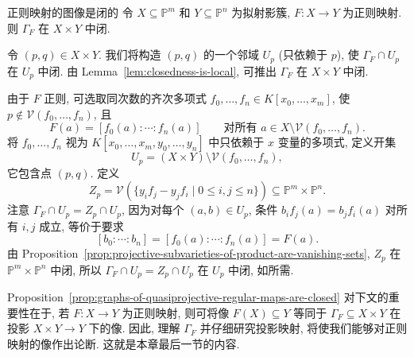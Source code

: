\begin{Proposition}{正则映射的图像是闭的}\leavevmode\label{prop:graphs-of-quasiprojective-regular-maps-are-closed}
令 $X\subseteq\mathbb{P}^{m}$ 和 $Y\subseteq\mathbb{P}^{n}$ 为拟射影簇, $F:X\to Y$ 为正则映射. 则 $\Gamma_{F}$ 在 $X\times Y$ 中闭.
\end{Proposition}
\begin{Proof}
令 $(p,q)\in X\times Y$. 我们将构造 $(p,q)$ 的一个邻域 $U_{p}$ (只依赖于 $p$), 使 $\Gamma_{F}\cap U_{p}$ 在 $U_{p}$ 中闭. 由 Lemma~\ref{lem:closedness-is-local}, 可推出 $\Gamma_{F}$ 在 $X\times Y$ 中闭.

由于 $F$ 正则, 可选取同次数的齐次多项式 $f_{0},\ldots,f_{n}\in K[x_{0},\ldots,x_{m}]$, 使 $p\notin\mathcal{V}(f_{0},\ldots,f_{n})$, 且
\[
  F(a)=[f_{0}(a):\cdots:f_{n}(a)]
  \qquad\text{对所有 }a\in X\setminus\mathcal{V}(f_{0},\ldots,f_{n}).
\]
将 $f_{0},\ldots,f_{n}$ 视为 $K[x_{0},\ldots,x_{m},y_{0},\ldots,y_{n}]$ 中只依赖于 $x$ 变量的多项式, 定义开集
\[
  U_{p}=(X\times Y)\setminus\mathcal{V}(f_{0},\ldots,f_{n}),
\]
它包含点 $(p,q)$. 定义
\[
  Z_{p}=\mathcal{V}(\{y_{i}f_{j}-y_{j}f_{i}\mid0\le i,j\le n\})
    \subseteq\mathbb{P}^{m}\times\mathbb{P}^{n}.
\]
注意 $\Gamma_{F}\cap U_{p}=Z_{p}\cap U_{p}$, 因为对每个 $(a,b)\in U_{p}$, 条件 $b_{i}f_{j}(a)=b_{j}f_{i}(a)$ 对所有 $i,j$ 成立, 等价于要求
\[
  [b_{0}:\cdots:b_{n}]=[f_{0}(a):\cdots:f_{n}(a)]=F(a).
\]
由 Proposition~\ref{prop:projective-subvarieties-of-product-are-vanishing-sets}, $Z_{p}$ 在 $\mathbb{P}^{m}\times\mathbb{P}^{n}$ 中闭, 所以 $\Gamma_{F}\cap U_{p}=Z_{p}\cap U_{p}$ 在 $U_{p}$ 中闭, 如所需.
\end{Proof}

Proposition~\ref{prop:graphs-of-quasiprojective-regular-maps-are-closed} 对下文的重要性在于, 若 $F:X\to Y$ 为正则映射, 则可将像 $F(X)\subseteq Y$ 等同于 $\Gamma_{F}\subseteq X\times Y$ 在投影 $X\times Y\to Y$ 下的像. 因此, 理解 $\Gamma_{F}$ 并仔细研究投影映射, 将使我们能够对正则映射的像作出论断. 这就是本章最后一节的内容.


